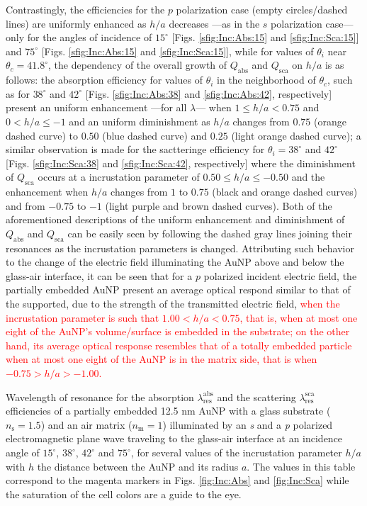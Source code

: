 Contrastingly, the efficiencies for the $p$ polarization case (empty circles/dashed lines) are uniformly enhanced as $h/a$ decreases ---as in the $s$ polarization case--- only for the angles of incidence of $15^\circ$ [Figs. \ref{sfig:Inc:Abs:15} and \ref{sfig:Inc:Sca:15}] and $75^\circ$ [Figs. \ref{sfig:Inc:Abs:15} and \ref{sfig:Inc:Sca:15}], while for values of $\theta_i$ near $\theta_c = 41.8^\circ$, the dependency of the overall growth of $Q_\text{abs}$ and $Q_\text{sca}$ on $h/a$ is as follows: the absorption efficiency for values of $\theta_i $ in the neighborhood of $\theta_c$, such as for $38^\circ$ and $42^\circ$ [Figs. \ref{sfig:Inc:Abs:38} and \ref{sfig:Inc:Abs:42}, respectively] present an uniform enhancement ---for all $\lambda$--- when $1 \leq h/a < 0.75$ and $0< h/a \leq -1$ and an uniform diminishment as $h/a$ changes from $0.75$ (orange dashed curve) to $0.50$  (blue dashed curve)  and $0.25$  (light orange dashed curve); a similar observation is made for the sactteringe efficiency for $\theta_i = 38 ^\circ$ and $42 ^\circ$   [Figs. \ref{sfig:Inc:Sca:38} and \ref{sfig:Inc:Sca:42}, respectively] where the diminishment of $Q_\text{sca}$ occurs at a incrustation parameter of $0.50 \leq h/a \leq -0.50$ and the enhancement when $h/a$ changes from $1$ to $0.75$ (black and orange dashed curves) and from $-0.75$ to $-1$  (light purple and brown dashed curves). Both of the aforementioned descriptions of the uniform enhancement and diminishment of $Q_\text{abs}$ and $Q_\text{sca}$ can be easily seen by following the dashed gray lines joining their resonances as the incrustation parameters is changed. Attributing such behavior to the change of the electric field illuminating the AuNP above and below the glass-air interface, it can be seen that for a $p$ polarized incident electric field, the partially embedded AuNP present an average optical respond similar to that of the supported, due to the strength of the transmitted electric field,  \textcolor{red}{when the incrustation parameter is such that $1.00<h/a<0.75$, that is, when at most one eight of the AuNP's volume/surface is embedded in the substrate; on the other hand, its average optical response resembles that of a totally embedded particle when at most one eight of the AuNP is in the matrix side, that is when  $-0.75>h/a>-1.00$.}

\begin{table}[b!]\footnotesize\centering
    \caption{Wavelength of resonance for the absorption $\lambda_\text{res}^\text{abs}$ and the scattering $\lambda_\text{res}^\text{sca}$ efficiencies of a partially embedded 12.5 nm AuNP with a glass substrate ($n_\text{s} = 1.5$) and an air matrix ($n_\text{m} = 1$)    illuminated by an \textit{s} and a \textit{p} polarized electromagnetic plane wave traveling to the glass-air interface at an incidence angle of $15^\circ$,  $38^\circ$,  $42^\circ$ and  $75^\circ$, for several values of the incrustation parameter $h/a$ with $h$ the distance between the AuNP and its radius $a$. The values in this table correspond to the magenta markers in Figs. \ref{fig:Inc:Abs} and \ref{fig:Inc:Sca} while the saturation of the cell colors are a guide to the eye.}
    \label{tab:Resonances}
    
\end{table}

